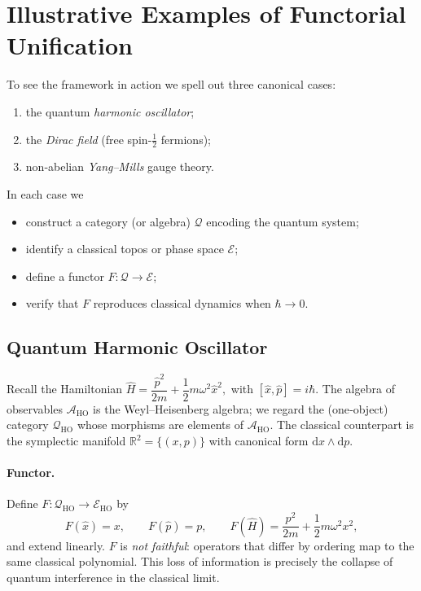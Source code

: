 \section{Illustrative Examples of Functorial Unification}

To see the framework in action we spell out three canonical cases:
\begin{enumerate}
  \item the quantum \emph{harmonic oscillator};
  \item the \emph{Dirac field} (free spin‑$\tfrac12$ fermions);
  \item non‑abelian \emph{Yang–Mills} gauge theory.
\end{enumerate}

In each case we
\begin{itemize}
  \item construct a category (or algebra) $\mathcal Q$ encoding the quantum
        system;
  \item identify a classical topos or phase space $\mathcal E$;
  \item define a functor $F\colon\mathcal Q\to\mathcal E$;
  \item verify that $F$ reproduces classical dynamics when $\hbar\to0$.
\end{itemize}

\bigskip

\subsection{Quantum Harmonic Oscillator}\label{subsec:QHO}

Recall the Hamiltonian
\(
  \widehat H=\dfrac{\widehat p^{2}}{2m}+\dfrac12 m\omega^{2}\widehat x^{2},
\)
with $[\widehat x,\widehat p]=i\hbar$.  The algebra of observables
$\mathcal A_{\mathrm{HO}}$ is the Weyl–Heisenberg algebra; we regard the
(one‑object) category $\mathcal Q_{\mathrm{HO}}$ whose morphisms are
elements of $\mathcal A_{\mathrm{HO}}$.
The classical counterpart is the symplectic manifold
$\mathbb R^{2}=\{(x,p)\}$ with canonical form $\mathrm d x\wedge\mathrm d p$.

\medskip

\paragraph{Functor.}
Define $F\colon\mathcal Q_{\mathrm{HO}}\to\mathcal E_{\mathrm{HO}}$ by
\[
  F(\widehat x)=x,\qquad
  F(\widehat p)=p,\qquad
  F(\widehat H)=\dfrac{p^{2}}{2m}+\dfrac12 m\omega^{2}x^{2},
\]
and extend linearly.  $F$ is \emph{not faithful}: operators that differ by
ordering map to the same classical polynomial.  This loss of information is
precisely the collapse of quantum interference in the classical limit.

